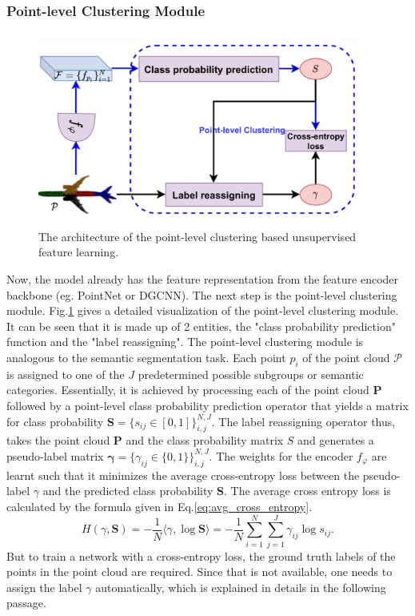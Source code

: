 \subsubsection{Point-level Clustering Module}
\begin{figure}[t]
    \centering
    \includegraphics[width=300pt,height=180pt]{pictures/point_level.jpg}
    \caption{The architecture of the point-level clustering based unsupervised feature learning.\cite{mei2022unsupervised}}
    \label{fig:point_level}
\end{figure} 
 Now, the model already has the feature representation from the feature encoder backbone (eg. PointNet or  \ac{DGCNN}). The next step is the point-level clustering module. Fig.\ref{fig:point_level} gives a detailed visualization of the point-level clustering module. It can be seen that it is made up of 2 entities, the "class probability prediction" function and the "label reassigning". The point-level clustering module is analogous to the semantic segmentation task. Each point $p_i$ of the point cloud $\mathcal{P}$ is assigned to one of the $J$ predetermined possible subgroups or semantic categories. Essentially, it is achieved by processing each of the point cloud $\mathcal{\textbf{P}}$ followed by a point-level class probability prediction operator that yields a matrix for class probability $\mathit{\textbf{S}} = \{ s_{ij} \in [0,1]\}_{i,j}^{N,J}$. The label reassigning operator thus, takes the point cloud $\mathcal{\textbf{P}}$ and the class probability matrix $S$ and generates a pseudo-label matrix $\mathit{\mathbf{\gamma}} = \{ \gamma_{ij} \in \{0,1\}\}_{i,j}^{N,J}$. The weights for the encoder $f_{\varphi}$ are learnt such that it minimizes the average cross-entropy loss between the pseudo-label $\gamma$ and the predicted class probability $\textbf{S}$. The average cross entropy loss is calculated by the formula given in Eq.\ref{eq:avg_cross_entropy}.
\begin{equation}
    \label{eq:avg_cross_entropy}
    \mathit{H}(\gamma,\textbf{S})= \mathit{ - \frac{1}{N}} \langle \gamma,\log \textbf{S} \rangle = \mathit{ - \frac{1}{N}} \sum_{i=1}^{N} \sum_{j=1}^{J} \gamma_{ij} \log s_{ij}.
\end{equation}
But to train a network with a cross-entropy loss, the ground truth labels of the points in the point cloud are required. Since that is not available, one needs to assign the label $\gamma$ automatically, which is explained in details in the following passage. 

